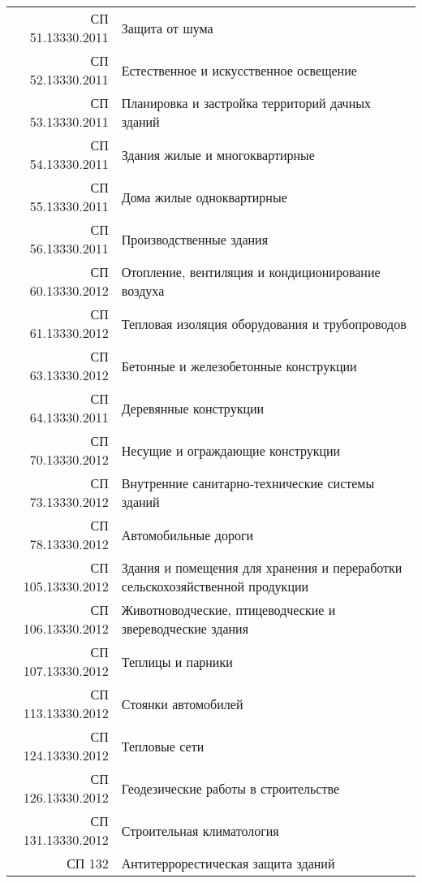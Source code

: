 \documentclass[12pt, twocolumn]{report}
\begin{document}
\begin{tabular}{rp{14cm}}
СП 51.13330.2011 & Защита от шума \\
СП 52.13330.2011 & Естественное и искусственное освещение \\
СП 53.13330.2011 & Планировка и застройка территорий дачных зданий \\
СП 54.13330.2011 & Здания жилые и многоквартирные \\
СП 55.13330.2011 & Дома жилые одноквартирные \\
СП 56.13330.2011 & Производственные здания \\
СП 60.13330.2012 & Отопление, вентиляция и кондиционирование воздуха \\
СП 61.13330.2012 & Тепловая изоляция оборудования и трубопроводов \\
СП 63.13330.2012 & Бетонные и железобетонные конструкции \\
СП 64.13330.2011 & Деревянные конструкции \\
СП 70.13330.2012 & Несущие и ограждающие конструкции \\
СП 73.13330.2012 & Внутренние санитарно-технические системы зданий \\
СП 78.13330.2012 & Автомобильные дороги \\
СП 105.13330.2012 & Здания и помещения для хранения и переработки сельскохозяйственной продукции \\
СП 106.13330.2012 & Животноводческие, птицеводческие и звереводческие здания \\
СП 107.13330.2012 & Теплицы и парники \\
СП 113.13330.2012 & Стоянки автомобилей \\
СП 124.13330.2012 & Тепловые сети \\
СП 126.13330.2012 & Геодезические работы в строительстве \\
СП 131.13330.2012 & Строительная климатология \\
СП 132 & Антитеррорестическая защита зданий \\
\end{tabular}

\newpage



\end{document}
